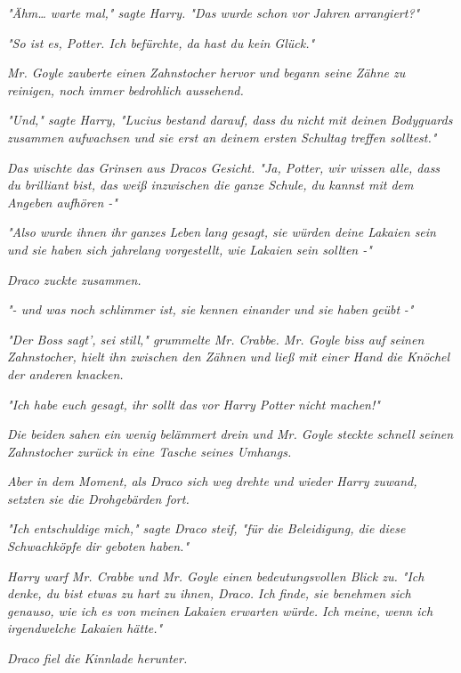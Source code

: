 {\emph{"Ähm… warte mal," sagte Harry. "Das wurde schon vor} \emph{\emph{Jahren}} \emph{arrangiert?"}

\emph{"So ist es, Potter. Ich befürchte, da hast du kein Glück."}

\emph{Mr. Goyle zauberte einen Zahnstocher hervor und begann seine Zähne zu reinigen, noch immer bedrohlich aussehend.}

\emph{"Und," sagte Harry, "Lucius bestand darauf, dass du} \emph{\emph{nicht}} \emph{mit deinen Bodyguards zusammen aufwachsen und sie erst an deinem ersten Schultag treffen solltest."}

\emph{Das wischte das Grinsen aus Dracos Gesicht. "Ja, Potter, wir wissen alle, dass du brilliant bist, das weiß inzwischen die ganze Schule, du kannst mit dem Angeben aufhören -"}

\emph{"Also wurde ihnen ihr} \emph{\emph{ganzes Leben}} \emph{lang gesagt, sie würden deine Lakaien sein und sie haben sich} \emph{\emph{jahrelang}} \emph{vorgestellt, wie Lakaien sein sollten -"}

\emph{Draco zuckte zusammen.}

\emph{"- und was noch schlimmer ist, sie} \emph{\emph{kennen einander}} \emph{und sie haben} \emph{\emph{geübt}} \emph{-"}

\emph{"Der Boss sagt', sei still," grummelte Mr. Crabbe. Mr. Goyle biss auf seinen Zahnstocher, hielt ihn zwischen den Zähnen und ließ mit einer Hand die Knöchel der anderen knacken.}

\emph{"\emph{Ich habe euch gesagt, ihr sollt das vor Harry Potter nicht machen!}"}

\emph{Die beiden sahen ein wenig belämmert drein und Mr. Goyle steckte schnell seinen Zahnstocher zurück in eine Tasche seines Umhangs.}

\emph{Aber in dem Moment, als Draco sich weg drehte und wieder Harry zuwand, setzten sie die Drohgebärden fort.}

\emph{"Ich entschuldige mich," sagte Draco steif, "für die Beleidigung, die diese} \emph{\emph{Schwachköpfe}} \emph{dir geboten haben."}

\emph{Harry warf Mr. Crabbe und Mr. Goyle einen bedeutungsvollen Blick zu. "Ich denke, du bist etwas zu hart zu ihnen, Draco.} \emph{\emph{Ich}} \emph{finde, sie benehmen sich genauso, wie ich es von} \emph{\emph{meinen}} \emph{Lakaien erwarten würde. Ich meine, wenn ich irgendwelche Lakaien hätte."}

\emph{Draco fiel die Kinnlade herunter.}

}
